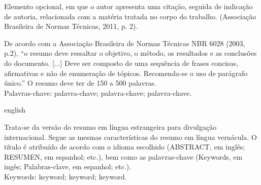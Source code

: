 \documentclass[
        oneside,      %
        english,			
        brazil			 
        ]{abntbibufjf}
\begin{document}

\begin{epigrafemais} %
	Elemento opcional, em que o autor apresenta uma cita\c{c}\~ao, seguida de indica\c{c}\~ao de autoria, relacionada com a                       
  mat\'eria tratada no corpo do trabalho. (Associa\c{c}\~ao Brasileira de Normas T\'ecnicas, 2011, p. 2).
\end{epigrafemais}



\begin{resumo}

De acordo com a Associa\c{c}\~ao Brasileira de Normas T\'ecnicas NBR 6028 (2003, p.2), ``o resumo deve ressaltar 
o objetivo, o m\'etodo, os resultados e as conclus\~oes do documento. [...] Deve ser composto de uma sequ\^encia de frases 
concisas, afirmativas e n\~ao de enumera\c{c}\~ao de t\'opicos. Recomenda-se o uso de par\'agrafo \'unico.'' 
O resumo deve ter de 150 a 500 palavras. \\[18pt]
Palavras-chave: palavra-chave; palavra-chave; palavra-chave. %
\end{resumo}
 
 
\begin{resumo}[ABSTRACT]
 \begin{otherlanguage*}{english}

Trata-se da vers\~ao do resumo em l\'ingua estrangeira para divulga\c{c}\~ao internacional. Segue as mesmas caracter\'isticas do resumo em 
l\'ingua vern\'acula. O t\'itulo \'e atribu\'ido de acordo com o idioma escolhido (ABSTRACT, em ingl\^es; RESUMEN, em espanhol; etc.), bem como 
as palavras-chave (Keywords, em ing\^es; Palabras-clave, em espanhol; etc.). \\[18pt]
Keywords: keyword; keyword; keyword. %
 \end{otherlanguage*}
\end{resumo}




\end{document}
